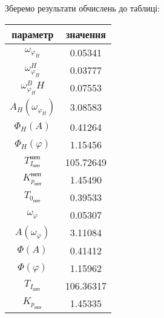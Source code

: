 Зберемо результати обчислень до таблиці:
\begin{center}
    \begin{tabular}{|c|c|}
        \hline
        параметр & значення \\
        \hline
        $\omega_{\varphi_H}$ & 0.05341\\
        \hline
        $\omega_{\varphi_H}^H$ & 0.03777\\
        \hline
        $\omega_{\varphi_H}^BH$ & 0.07553\\
        \hline
        $A_H\left(\omega_{\varphi_H}\right)$ & 3.08583\\
        \hline
        $\Phi_H(A)$ & 0.41264\\
        \hline
        $\Phi_H(\varphi)$ & 1.15456\\
        \hline
        $T_{I_{\text{опт}}}^{\text{неп}}$ & 105.72649\\
        \hline
        $K_{p_{\text{опт}}}^{\text{неп}}$ & 1.45490\\
        \hline
        $T_{0_{\text{опт}}}$ & 0.39533\\
        \hline
        $\omega_{\varphi}$ & 0.05307\\
        \hline
        $A\left(\omega_{\varphi}\right)$ & 3.11084\\
        \hline
        $\Phi(A)$ & 0.41412\\
        \hline
        $\Phi(\varphi)$ & 1.15962\\
        \hline
        $T_{I_{\text{опт}}}$ & 106.36317\\
        \hline
        $K_{p_{\text{опт}}}$ & 1.45335\\
        \hline
     \end{tabular}
\end{center}
